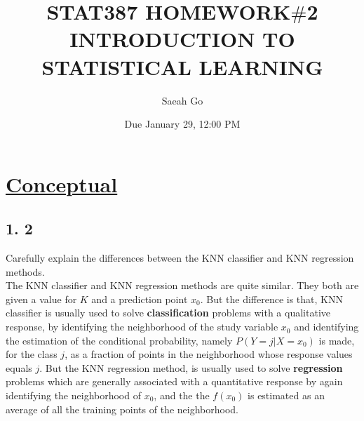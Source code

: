 \documentclass{article}
\title{STAT387 HOMEWORK$\#$2 \linebreak \linebreak
\large INTRODUCTION TO STATISTICAL LEARNING}
\author{Saeah Go}
\date{Due January 29, 12:00 PM}
\begin{document}
\maketitle

\section*{\underline{Conceptual}}
\subsection*{1. 2}
Carefully explain the differences between the KNN classifier and KNN
regression methods. \\
\indent \indent The KNN classifier and KNN regression methods are quite similar. They both are given a value for $K$ and a prediction point $x_0$.
But the difference is that, KNN classifier is usually used to solve \textbf{classification} problems with a qualitative response, by identifying the neighborhood of the study variable $x_0$ and identifying the estimation of the conditional probability, namely $P(Y = j | X = x_0)$ is made, for the class $j$, as a fraction of points in the neighborhood whose response values equals $j$.
But the KNN regression method, is usually used to solve \textbf{regression} problems which are generally associated with a quantitative response by again identifying the neighborhood of $x_0$, and the the $f(x_0)$ is estimated as an average of all the training points of the neighborhood. 
\end{document}
